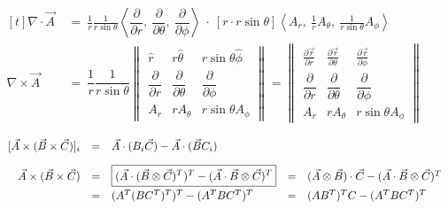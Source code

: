 \documentclass[12pt]{article}
\newcommand{\hs}{\hspace{1pt}} %
\newcommand{\hsvec}[1]{\vec{\hs #1}} %
\begin{document}
{	\vspace{15pt}
	\(\begin{aligned}[t]
		\nabla \cdot \vec{A} \ & 
			= \ \frac{1}{r} \frac{1}{r \sin{\theta}} 
			\left\langle 
				\dfrac{\partial}{\partial r} , \ 
				\dfrac{\partial}{\partial \theta} , \ 
				\dfrac{\partial}{\partial \phi} 
			\right\rangle 
			\ \cdot \ [ r \cdot r \sin{\theta} ]
			\left\langle A_r , \ \frac{1}{r} A_\theta , \ \frac{1}{ r \sin{\theta} } A_\phi \right\rangle
			\\[15pt]
		\nabla \times \vec{A} \ & 
			= \ \dfrac{1}{r} \dfrac{1}{ r \sin{\theta} } 
			\begin{Vmatrix}
				\hat{r} 					 & r \hat{\theta} 			    & r \sin{\theta} \hat{\phi}\\[10pt]
				\dfrac{\partial}{\partial r} & \dfrac{\partial}{\partial \theta} & \dfrac{\partial}{\partial \phi}\\[10pt]
				A_r							 & r A_\theta				    & r \sin{\theta} A_\phi
			\end{Vmatrix}
			= 
			\begin{Vmatrix}
				\tfrac{\partial \hsvec{r}}{\partial r}  
					& \tfrac{\partial \hsvec{r}}{\partial \theta} 
					& \tfrac{\partial \hsvec{r}}{\partial \phi} 
					\\[10pt]
				\dfrac{\partial}{\partial r} & \dfrac{\partial}{\partial \theta} & \dfrac{\partial}{\partial \phi}\\[10pt]
				A_r							 & r A_\theta				    & r \sin{\theta} A_\phi
			\end{Vmatrix}
	\end{aligned}\)

	\vspace{20pt}
	\(\begin{array}{r c l c l}
		\relax[ \vec{A} \times (\vec{B} \times \vec{C}) ]_i 
			&=& \vec{A} \cdot ( B_i \vec{C} ) - \vec{A} \cdot ( \vec{B} C_i ) 
			\\[10pt]
		\vec{A} \times (\vec{B} \times \vec{C}) 
			&=& \boxed{ ( \vec{A} \cdot ( \vec{B} \otimes \vec{C} )^T )^T - ( \vec{A} \cdot \vec{B} \otimes \vec{C} )^T }
			&=& ( \vec{A} \otimes \vec{B} ) \cdot \vec{C} - ( \vec{A} \cdot \vec{B} \otimes \vec{C} )^T 
			\\[5pt]
		&=& ( A^T ( BC^T )^T )^T - ( A^T BC^T )^T
			&=& (AB^T)^T C - ( A^T BC^T )^T
	\end{array}\)
}
\end{document}
